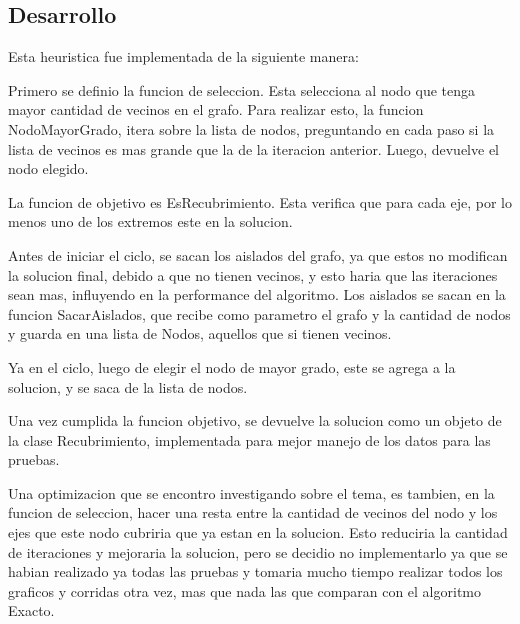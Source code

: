 \subsection{Desarrollo}
Esta heuristica fue implementada de la siguiente manera:

Primero se definio la funcion de seleccion. Esta selecciona al nodo que tenga mayor cantidad de vecinos en el grafo. Para realizar esto, la funcion NodoMayorGrado, itera sobre la lista de nodos, preguntando en cada paso si la lista de vecinos es mas grande que la de la iteracion anterior. Luego, devuelve el nodo elegido.

La funcion de objetivo es EsRecubrimiento. Esta verifica que para cada eje, por lo menos uno de los extremos este en la solucion.

Antes de iniciar el ciclo, se sacan los aislados del grafo, ya que estos no modifican la solucion final, debido a que no tienen vecinos, y esto haria que las iteraciones sean mas, influyendo en la performance del algoritmo. 
Los aislados se sacan en la funcion SacarAislados, que recibe como parametro el grafo y la cantidad de nodos y guarda en una lista de Nodos, aquellos que si tienen vecinos.

Ya en el ciclo, luego de elegir el nodo de mayor grado, este se agrega a la solucion, y se saca de la lista de nodos.

Una vez cumplida la funcion objetivo, se devuelve la solucion como un objeto de la clase Recubrimiento, implementada para mejor manejo de los datos para las pruebas.

Una optimizacion que se encontro investigando sobre el tema, es tambien, en la funcion de seleccion, hacer una resta entre la cantidad de vecinos del nodo y los ejes que este nodo cubriria que ya estan en la solucion. Esto reduciria la cantidad de iteraciones y mejoraria la solucion, pero se decidio no implementarlo ya que se habian realizado ya todas las pruebas y tomaria mucho tiempo realizar todos los graficos y corridas otra vez, mas que nada las que comparan con el algoritmo Exacto.
